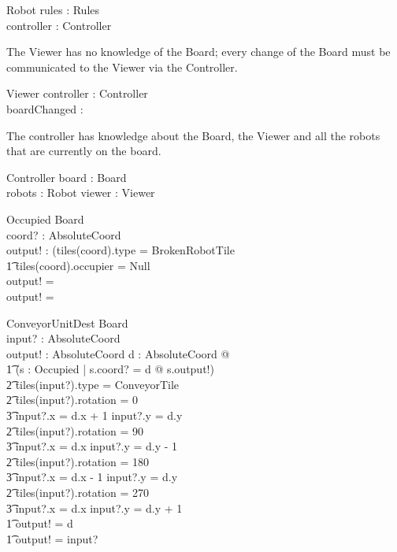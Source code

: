 \documentclass[12pt]{article}
\begin{document}
\begin{schema}{Robot}
rules : Rules \\
controller : Controller
\end{schema}

The Viewer has no knowledge of the Board; every change of the Board must be communicated to the Viewer via the Controller.

\begin{schema}{Viewer}
controller : Controller \\
boardChanged : \bool
\end{schema}

The controller has knowledge about the Board, the Viewer and all the robots that are currently on the board.

\begin{schema}{Controller}
board : Board \\
robots : \power Robot
viewer : Viewer
\end{schema}

\begin{schema}{Occupied}
\Xi Board \\
coord? : AbsoluteCoord \\
output! : \bool
\where
\IF (tiles(coord).type = BrokenRobotTile \; \; \vee \\ \t1
tiles(coord).occupier \not = Null \\
\THEN
output! = \true \\
\ELSE
output! = \false
\end{schema}

\begin{schema}{ConveyorUnitDest}
\Xi Board \\
input? : AbsoluteCoord \\
output! : AbsoluteCoord
\where
\IF \exists d : AbsoluteCoord @ \\ \t1
    (\exists s : Occupied | s.coord? = d @ \neg s.output!) \; \; \wedge \\ \t2
        tiles(input?).type = ConveyorTile \\ \t2
        tiles(input?).rotation = 0 \Rightarrow \\ \t3 input?.x = d.x + 1 \wedge input?.y = d.y \\ \t2
        tiles(input?).rotation = 90 \Rightarrow \\ \t3 input?.x = d.x \wedge input?.y = d.y - 1 \\ \t2
        tiles(input?).rotation = 180 \Rightarrow \\ \t3 input?.x = d.x - 1 \wedge input?.y = d.y \\ \t2
        tiles(input?).rotation = 270 \Rightarrow \\ \t3 input?.x = d.x \wedge input?.y = d.y + 1 \\ \t1
    \THEN output! = d \\ \t1
    \ELSE output! = input?
\end{schema}
\end{document}
